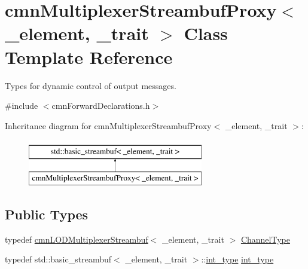 \hypertarget{classcmn_multiplexer_streambuf_proxy}{}\section{cmn\+Multiplexer\+Streambuf\+Proxy$<$ \+\_\+element, \+\_\+trait $>$ Class Template Reference}
\label{classcmn_multiplexer_streambuf_proxy}


Types for dynamic control of output messages.  




{\ttfamily \#include $<$cmn\+Forward\+Declarations.\+h$>$}

Inheritance diagram for cmn\+Multiplexer\+Streambuf\+Proxy$<$ \+\_\+element, \+\_\+trait $>$\+:\begin{figure}[H]
\begin{center}
\leavevmode
\includegraphics[height=2.000000cm]{da/d9e/classcmn_multiplexer_streambuf_proxy}
\end{center}
\end{figure}
\subsection*{Public Types}
\begin{DoxyCompactItemize}
\item 
typedef \hyperlink{classcmn_l_o_d_multiplexer_streambuf}{cmn\+L\+O\+D\+Multiplexer\+Streambuf}$<$ \+\_\+element, \+\_\+trait $>$ \hyperlink{classcmn_multiplexer_streambuf_proxy_aad26781c796870ad583a690f1d4132bb}{Channel\+Type}
\item 
typedef std\+::basic\+\_\+streambuf$<$ \+\_\+element, \+\_\+trait $>$\+::\hyperlink{classcmn_multiplexer_streambuf_proxy_ac600a28e3e3c860fc54ca7e7931bc6df}{int\+\_\+type} \hyperlink{classcmn_multiplexer_streambuf_proxy_ac600a28e3e3c860fc54ca7e7931bc6df}{int\+\_\+type}
\end{DoxyCompactItemize}
